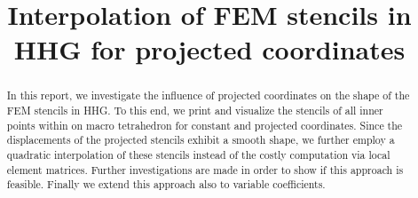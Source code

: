 \documentclass[a4paper,11pt,reqno]{amsart}
\title{Interpolation of FEM stencils in HHG for projected coordinates}
\numberwithin{figure}{section}
\numberwithin{table}{section}
\begin{document}
\maketitle

\begin{abstract}
In this report, we investigate the influence of projected coordinates on
the shape of the FEM stencils in HHG. To this end, we print and visualize 
the stencils of all inner points within on macro tetrahedron for constant
and projected coordinates. Since the displacements of the projected stencils
exhibit a smooth shape, we further employ a quadratic interpolation of
these stencils instead of the costly computation via local element matrices.
Further investigations are made in order to show if this approach is feasible.
Finally we extend this approach also to variable coefficients.
\end{abstract}\medskip

\end{document}
